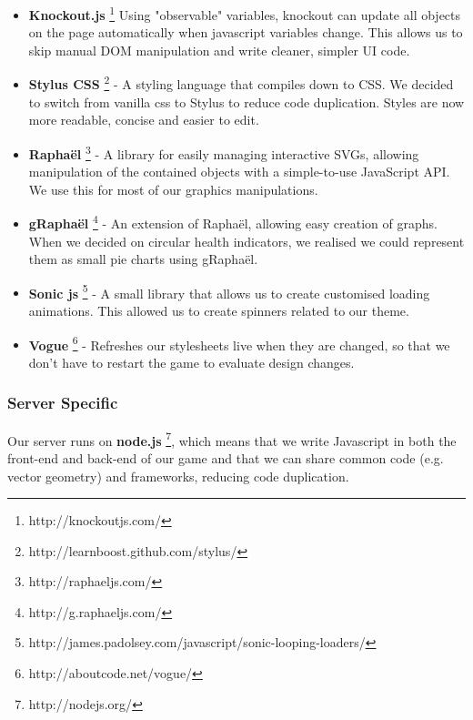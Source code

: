 \documentclass[a4wide, 11pt]{article}
\begin{document}
\begin{itemize}
  \item
    {\bf Knockout.js}
    \footnote{http://knockoutjs.com/}
    Using "observable" variables, knockout can update all objects on the page automatically when javascript variables change. This allows us to skip manual DOM manipulation and write cleaner, simpler UI code.
  \item
    {\bf Stylus CSS}
    \footnote{http://learnboost.github.com/stylus/}
    - A styling language that compiles down to CSS. We decided to switch from vanilla css to Stylus to reduce code duplication. Styles are now more readable, concise and easier to edit.

  \item
    {\bf Rapha\"{e}l}
    \footnote{http://raphaeljs.com/}
    - A library for easily managing interactive SVGs, allowing manipulation of the contained objects with a simple-to-use JavaScript API. We use this for most of our graphics manipulations.

  \item
    {\bf gRapha\"{e}l}
    \footnote{http://g.raphaeljs.com/}
    - An extension of Rapha\"{e}l, allowing easy creation of graphs. When we decided on circular health indicators, we realised we could represent them as small pie charts using gRapha\"{e}l.

  \item
    {\bf Sonic js}
    \footnote{http://james.padolsey.com/javascript/sonic-looping-loaders/}
    - A small library that allows us to create customised loading animations. This allowed us to create spinners related to our theme.
  
  \item
    {\bf Vogue}
    \footnote{http://aboutcode.net/vogue/}
    - Refreshes our stylesheets live when they are changed, so that we don't have to restart the game to evaluate design changes.

\end{itemize}

\subsubsection{Server Specific}
Our server runs on \textbf{node.js} \footnote{http://nodejs.org/}, which means that we write Javascript in both the front-end and back-end of our game and that we can share common code (e.g. vector geometry) and frameworks, reducing code duplication.
\end{document}
